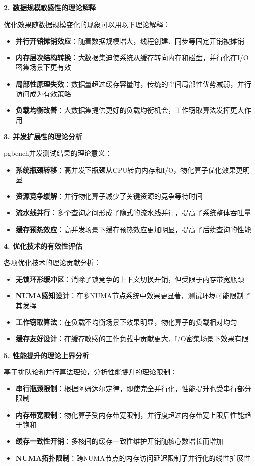\textbf{2. 数据规模敏感性的理论解释}

优化效果随数据规模变化的现象可以用以下理论解释：
\begin{itemize}
    \item \textbf{并行开销摊销效应}：随着数据规模增大，线程创建、同步等固定开销被摊销
    \item \textbf{内存层次结构转换}：大数据集迫使系统从缓存转向内存和磁盘，并行化在I/O密集场景下更有效
    \item \textbf{局部性原理失效}：数据量超过缓存容量时，传统的空间局部性优势减弱，并行访问成为有效策略
    \item \textbf{负载均衡改善}：大数据集提供更好的负载均衡机会，工作窃取算法发挥更大作用
\end{itemize}

\textbf{3. 并发扩展性的理论分析}

pgbench并发测试结果的理论意义：
\begin{itemize}
    \item \textbf{系统瓶颈转移}：高并发下瓶颈从CPU转向内存和I/O，物化算子优化效果更明显
    \item \textbf{资源竞争缓解}：并行物化算子减少了关键资源的竞争等待时间
    \item \textbf{流水线并行}：多个查询之间形成了隐式的流水线并行，提高了系统整体吞吐量
    \item \textbf{缓存预热效应}：高并发场景下缓存预热效应更加明显，提高了后续查询的性能
\end{itemize}

\textbf{4. 优化技术的有效性评估}

各项优化技术的理论贡献分析：
\begin{itemize}
    \item \textbf{无锁环形缓冲区}：消除了锁竞争的上下文切换开销，但受限于内存带宽瓶颈
    \item \textbf{NUMA感知设计}：在多NUMA节点系统中效果更显著，测试环境可能限制了其发挥
    \item \textbf{工作窃取算法}：在负载不均衡场景下效果明显，物化算子的负载相对均匀
    \item \textbf{缓存友好设计}：在缓存敏感的工作负载中贡献更大，I/O密集场景下效果有限
\end{itemize}

\textbf{5. 性能提升的理论上界分析}

基于排队论和并行算法理论，分析性能提升的理论限制：
\begin{itemize}
    \item \textbf{串行瓶颈限制}：根据阿姆达尔定律，即使完全并行化，性能提升也受串行部分限制
    \item \textbf{内存带宽限制}：物化算子受内存带宽限制，并行度超过内存带宽上限后性能趋于饱和
    \item \textbf{缓存一致性开销}：多核间的缓存一致性维护开销随核心数增长而增加
    \item \textbf{NUMA拓扑限制}：跨NUMA节点的内存访问延迟限制了并行化的线性扩展性
\end{itemize}

